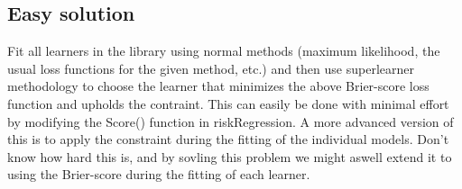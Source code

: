 \documentclass[11pt]{article}
\begin{document}
\subsection{Easy solution}
\label{sec:org9c988a9}
Fit all learners in the library using normal methods (maximum likelihood, the usual loss functions for the given method, etc.) and then use superlearner methodology to choose the learner that minimizes the above Brier-score loss function and upholds the contraint. This can easily be done with minimal effort by modifying the Score() function in riskRegression. A more advanced version of this is to apply the constraint during the fitting of the individual models. Don't know how hard this is, and by sovling this problem we might aswell extend it to using the Brier-score during the fitting of each learner.
\end{document}
